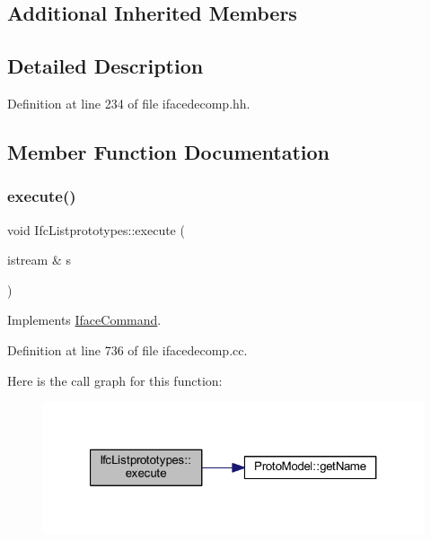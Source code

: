 \subsection*{Additional Inherited Members}


\subsection{Detailed Description}


Definition at line 234 of file ifacedecomp.\+hh.



\subsection{Member Function Documentation}
\mbox{\label{class_ifc_listprototypes_a6ec2d710e21d1c84a8d2b0ed8769f594}} 
\subsubsection{\texorpdfstring{execute()}{execute()}}
{\footnotesize\ttfamily void Ifc\+Listprototypes\+::execute (\begin{DoxyParamCaption}\item[{istream \&}]{s }\end{DoxyParamCaption})\hspace{0.3cm}{\ttfamily [virtual]}}



Implements \mbox{\hyperlink{class_iface_command_af10e29cee2c8e419de6efe9e680ad201}{Iface\+Command}}.



Definition at line 736 of file ifacedecomp.\+cc.

Here is the call graph for this function\+:
\nopagebreak
\begin{figure}[H]
\begin{center}
\leavevmode
\includegraphics[width=321pt]{class_ifc_listprototypes_a6ec2d710e21d1c84a8d2b0ed8769f594_cgraph}
\end{center}
\end{figure}



